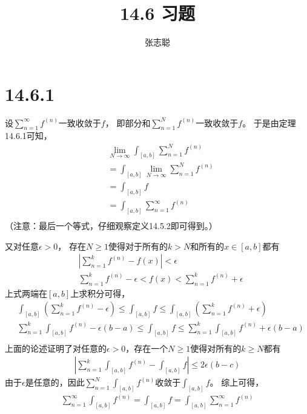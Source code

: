 \documentclass{article}
\begin{document}
\title{14.6 习题}
\author{张志聪}
\maketitle

\section*{14.6.1}

设$\sum\limits_{n=1}^{\infty} f^{(n)}$一致收敛于$f$，
即部分和$\sum\limits_{n=1}^{N} f^{(n)}$一致收敛于$f$。
于是由定理14.6.1可知，
\begin{align*}
   & \lim\limits_{N \to \infty} \int_{[a, b]} \sum\limits_{n=1}^{N} f^{(n)}   \\
   & = \int_{[a, b]} \lim\limits_{N \to \infty} \sum\limits_{n=1}^{N} f^{(n)} \\
   & = \int_{[a, b]} f                                                        \\
   & = \int_{[a, b]} \sum\limits_{n=1}^{\infty} f^{(n)}                       \\
\end{align*}
（注意：最后一个等式，仔细观察定义14.5.2即可得到。）

又对任意$\epsilon > 0$，
存在$N \geq 1$使得对于所有的$k > N$和所有的$x \in [a, b]$都有
\begin{align*}
   & |\sum\limits_{n=1}^{k} f^{(n)} - f(x)| < \epsilon                                         \\
   & \sum\limits_{n=1}^{k} f^{(n)} - \epsilon < f(x) < \sum\limits_{n=1}^{k} f^{(n)} +\epsilon
\end{align*}
上式两端在$[a, b]$上求积分可得，
\begin{align*}
   & \int_{[a, b]} (\sum\limits_{n=1}^{k} f^{(n)} - \epsilon) \leq \int_{[a, b]} f \leq \int_{[a, b]} (\sum\limits_{n=1}^{k} f^{(n)} + \epsilon)           \\
   & \sum\limits_{n=1}^{k} \int_{[a, b]} f^{(n)} - \epsilon(b - a) \leq \int_{[a, b]} f \leq \sum\limits_{n=1}^{k} \int_{[a, b]} f^{(n)} + \epsilon(b - a) \\
\end{align*}
上面的论述证明了对任意的$\epsilon > 0$，存在一个$N \geq 1$使得对所有的$k \geq N$都有
\begin{align*}
  \left|\sum\limits_{n=1}^{k} \int_{[a, b]} f^{(n)} - \int_{[a, b]} f \right| \leq 2\epsilon(b - c)
\end{align*}
由于$\epsilon$是任意的，因此$\sum\limits_{n=1}^{N} \int_{[a, b]} f^{(n)}$收敛于$\int_{[a, b]} f$。
综上可得，
\begin{align*}
  \sum\limits_{n=1}^{\infty} \int_{[a, b]} f^{(n)} = \int_{[a, b]} f = \int_{[a, b]} \sum\limits_{n=1}^{\infty} f^{(n)}
\end{align*}
\end{document}
